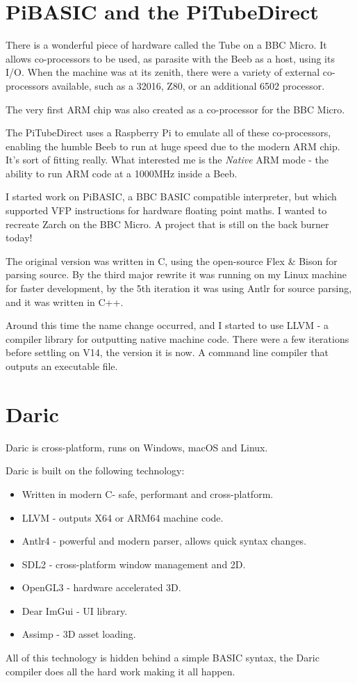 \documentclass[10pt]{book}
\newcommand{\CC}{C\nolinebreak\hspace{-.05em}\raisebox{.4ex}{\tiny\bf +}\nolinebreak\hspace{-.10em}\raisebox{.4ex}{\tiny\bf +}}
\def\CC{{C\nolinebreak[4]\hspace{-.05em}\raisebox{.4ex}{\tiny\bf ++}}}
\newcommand{\Daric}{Daric}
\begin{document}
\section{PiBASIC and the PiTubeDirect}
\par{There is a wonderful piece of hardware called the Tube on a BBC Micro. It allows co-processors to be used, as parasite with the Beeb as a host, using its I/O. When the machine was at its zenith, there were a variety of external co-processors available, such as a 32016, Z80, or an additional 6502 processor.}
\par{The very first ARM chip was also created as a co-processor for the BBC Micro.}
\par{The PiTubeDirect uses a Raspberry Pi to emulate all of these co-processors, enabling the humble Beeb to run at huge speed due to the modern ARM chip. It's sort of fitting really. What interested me is the \emph{Native} ARM mode - the ability to run ARM code at a 1000MHz inside a Beeb.}
\par{I started work on PiBASIC, a BBC BASIC compatible interpreter, but which supported VFP instructions for hardware floating point maths. I wanted to recreate Zarch on the BBC Micro. A project that is still on the back burner today!}
\par{The original version was written in C, using the open-source Flex \& Bison for parsing source. By the third major rewrite it was running on my Linux machine for faster development, by the 5th iteration it was using Antlr for source parsing, and it was written in C++.}
\par{Around this time the name change occurred, and I started to use LLVM - a compiler library for outputting native machine code. There were a few iterations before settling on V14, the version it is now. A command line compiler that outputs an executable file.}

\section{\Daric}
\par{\Daric{} is cross-platform, runs on Windows, macOS and Linux.}
\par{\Daric{} is built on the following technology:}
\begin{itemize}
\item Written in modern \CC - safe, performant and cross-platform.
\item LLVM - outputs X64 or ARM64 machine code. 
\item Antlr4 - powerful and modern parser, allows quick syntax changes. 
\item SDL2 - cross-platform window management and 2D. 
\item OpenGL3 - hardware accelerated 3D.
\item Dear ImGui - UI library.
\item Assimp - 3D asset loading.
\end{itemize}
\par{All of this technology is hidden behind a simple BASIC syntax, the \Daric{} compiler does all the hard work making it all happen.}
\end{document}
